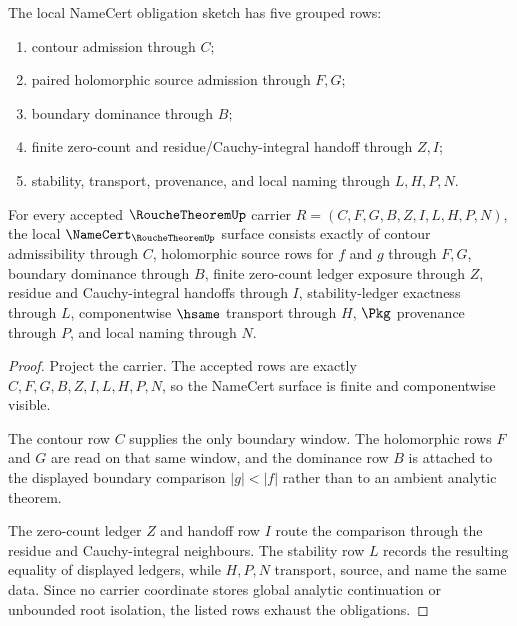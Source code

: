 The local NameCert obligation sketch has five grouped rows:
\begin{enumerate}
\item contour admission through $C$;
\item paired holomorphic source admission through $F,G$;
\item boundary dominance through $B$;
\item finite zero-count and residue/Cauchy-integral handoff through $Z,I$;
\item stability, transport, provenance, and local naming through $L,H,P,N$.
\end{enumerate}

\begin{theorem}
\label{thm:rouche-theorem-namecert-obligations}
For every accepted $\RoucheTheoremUp$ carrier $R=(C,F,G,B,Z,I,L,H,P,N)$, the local $\NameCert_{\RoucheTheoremUp}$ surface consists exactly of contour admissibility through $C$, holomorphic source rows for $f$ and $g$ through $F,G$, boundary dominance through $B$, finite zero-count ledger exposure through $Z$, residue and Cauchy-integral handoffs through $I$, stability-ledger exactness through $L$, componentwise $\hsame$ transport through $H$, $\Pkg$ provenance through $P$, and local naming through $N$.
\end{theorem}
\begin{proof}
Project the carrier. The accepted rows are exactly $C,F,G,B,Z,I,L,H,P,N$, so the NameCert surface is finite and componentwise visible.

The contour row $C$ supplies the only boundary window. The holomorphic rows $F$ and $G$ are read on that same window, and the dominance row $B$ is attached to the displayed boundary comparison $|g|<|f|$ rather than to an ambient analytic theorem.

The zero-count ledger $Z$ and handoff row $I$ route the comparison through the residue and Cauchy-integral neighbours. The stability row $L$ records the resulting equality of displayed ledgers, while $H,P,N$ transport, source, and name the same data. Since no carrier coordinate stores global analytic continuation or unbounded root isolation, the listed rows exhaust the obligations.
\end{proof}

